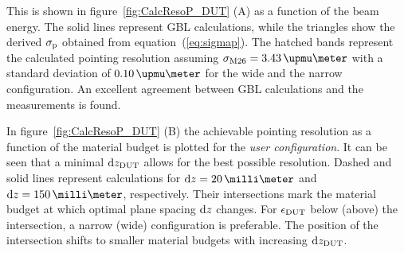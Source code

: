 \noindent
This is shown in figure~\ref{fig:CalcResoP_DUT} (A) as a function of the beam energy. 
The solid lines represent GBL calculations, while the triangles show the derived $\sigma_{\textrm{p}}$ obtained from equation~(\ref{eq:sigmap}). 
The hatched bands represent the calculated pointing resolution assuming $\sigmam = 3.43\,\upmu\meter$ with a standard deviation of $0.10\,\upmu\meter$ for the wide and the narrow configuration. 
An excellent agreement between GBL calculations and the measurements is found.

In figure~\ref{fig:CalcResoP_DUT} (B) the achievable pointing resolution as a function of the material budget is plotted for the \textit{user configuration}. 
It can be seen that a minimal $\textrm{d}z_{\textrm{DUT}}$ allows for the best possible resolution. 
Dashed and solid lines represent calculations for $\dz = 20\,\milli\meter$ and $\dz = 150\,\milli\meter$, respectively. 
Their intersections mark the material budget at which optimal plane spacing $\textrm{d}z$ changes.
For $\mathnormal{\epsilon_{\textrm{DUT}}}$ below (above) the intersection, a narrow (wide) configuration is preferable. 
The position of the intersection shifts to smaller material budgets with increasing $\textrm{d}z_{\textrm{DUT}}$. 

